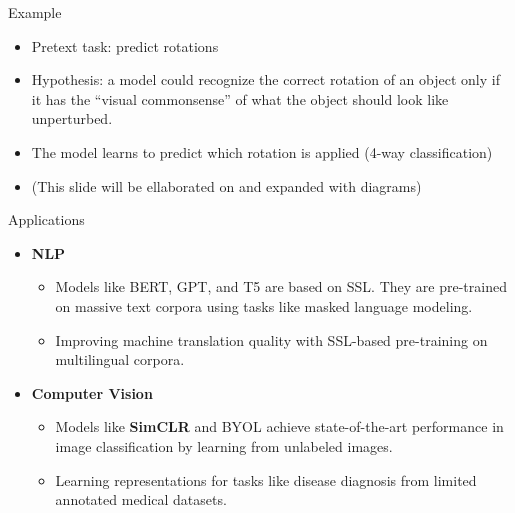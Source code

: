 \documentclass[serif, aspectratio=169]{beamer}
\begin{document}
\begin{frame}{Example}
      \begin{itemize}
 \item Pretext task: predict rotations
\item  Hypothesis: a model could recognize the correct rotation of an object 
only if it has the “visual commonsense” of what the object should look 
like unperturbed.
\item The model learns to 
predict which rotation 
is applied (4-way 
classification)
\item (This slide will be ellaborated on and expanded with diagrams)

  \end{itemize}
\end{frame}


\begin{frame}{Applications}
    \begin{itemize}
        \item \textbf{NLP}
        \begin{itemize}
            \item Models like BERT, GPT, and T5 are based on SSL. They are pre-trained on massive text corpora using tasks like masked language modeling.
            \item Improving machine translation quality with SSL-based pre-training on multilingual corpora. 
        \end{itemize}

        \item \textbf{Computer Vision}
        \begin{itemize}
            \item Models like \textbf{SimCLR} and BYOL achieve state-of-the-art performance in image classification by learning from unlabeled images.
            \item Learning representations for tasks like disease diagnosis from limited annotated medical datasets.
        \end{itemize}
    \end{itemize}
\end{frame}
\end{document}
